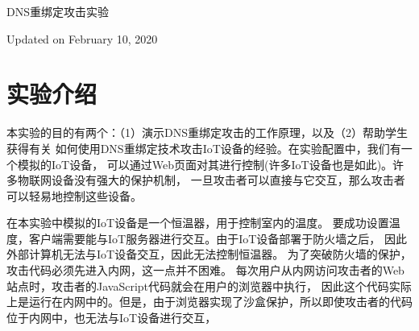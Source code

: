 



\newcommand{\rebindingFigs}{./Figs}





\begin{center}
{\LARGE DNS重绑定攻击实验}

\vspace{0.05in}
Updated on February 10, 2020
\end{center}



\setcounter{task}{1}
\newcommand{\tasks} {\bf {\noindent (\arabic{task})} \addtocounter{task}{1} \,}



\section{实验介绍}


本实验的目的有两个：（1）演示DNS重绑定攻击的工作原理，以及（2）帮助学生获得有关
如何使用DNS重绑定技术攻击IoT设备的经验。在实验配置中，我们有一个模拟的IoT设备，
可以通过Web页面对其进行控制(许多IoT设备也是如此)。许多物联网设备没有强大的保护机制，
一旦攻击者可以直接与它交互，那么攻击者可以轻易地控制这些设备。


在本实验中模拟的IoT设备是一个恒温器，用于控制室内的温度。
要成功设置温度，客户端需要能与IoT服务器进行交互。由于IoT设备部署于防火墙之后，
因此外部计算机无法与IoT设备交互，因此无法控制恒温器。
为了突破防火墙的保护，攻击代码必须先进入内网，这一点并不困难。
每次用户从内网访问攻击者的Web站点时，攻击者的JavaScript代码就会在用户的浏览器中执行，
因此这个代码实际上是运行在内网中的。但是，由于浏览器实现了沙盒保护，所以即使攻击者的代码
位于内网中，也无法与IoT设备进行交互，


